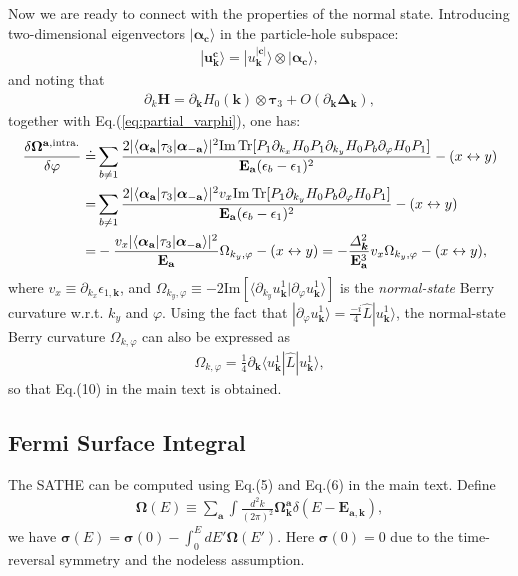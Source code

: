 \begin{subappendices}
Now we are ready to connect with the properties of the normal state. Introducing two-dimensional eigenvectors $|\boldsymbol\alpha_\mathbf c\rangle$ in the particle-hole subspace:
\begin{align}
	|\mathbf u^{\mathbf c}_{\bm{k}}\rangle=|u^{|\mathbf c|}_{\bm{k}}\rangle\otimes|\boldsymbol\alpha_\mathbf c \rangle,
\end{align}
and noting that
\begin{align}
	\partial_{k}\mathbf H=\partial_{\bm{k}} H_0(\bm{k})\otimes\boldsymbol\tau_3+O(\partial_{\bm{k}}\boldsymbol\Delta_{\bm{k}}),\label{eq:partial_k}
\end{align}
together with Eq.(\ref{eq:partial_varphi}), one has:
\begin{align}
	\frac{\delta \boldsymbol \Omega ^{\mathbf a,\text{intra.}}}{\delta \varphi}\doteq &\sum_{b\neq 1}\frac{2 |\langle \boldsymbol\alpha_\mathbf a|\tau_3| \boldsymbol\alpha_{-\mathbf a}\rangle|^2 \mbox{Im\,Tr}[P_1 \partial_{k_x}H_0 P_1 \partial_{k_y} H_0 P_b \partial_\varphi H_0 P_1]}{ \mathbf E_{\mathbf a} (\epsilon_{b}-\epsilon_{1})^2}-(x\leftrightarrow y)\notag\\
	=&\sum_{b\neq 1}\frac{2 |\langle \boldsymbol\alpha_\mathbf a|\tau_3| \boldsymbol\alpha_{-\mathbf a}\rangle|^2 v_x \mbox{Im\,Tr}[ P_1 \partial_{k_y} H_0 P_b \partial_\varphi H_0 P_1]}{ \mathbf E_{\mathbf a} (\epsilon_{b}-\epsilon_{1})^2}-(x\leftrightarrow y)\notag\\
	=&- \frac{v_x|\langle \boldsymbol\alpha_\mathbf a|\tau_3| \boldsymbol\alpha_{-\mathbf a}\rangle|^2     }{\mathbf E_{\mathbf a}}\Omega_{k_y,\varphi}-(x\leftrightarrow y)=- \frac{\varDelta_{\bm{k}}^2}{\mathbf E_{\mathbf a}^3}v_x  \Omega_{k_y,\varphi}-(x\leftrightarrow y),
\end{align}
where $v_x\equiv \partial_{k_x} \epsilon_{1,\bm{k}}$, and $\Omega_{k_y,\varphi}\equiv -2\mbox{Im}[\langle\partial_{k_y} u^1_{\bm{k}}|\partial_\varphi u^1_{\bm{k}}\rangle]$ is the \emph{normal-state} Berry curvature w.r.t. $k_y$ and $\varphi$. Using the fact that $|\partial_\varphi u^1_{\bm{k}}\rangle=\frac{-i}{4}\hat L |u^1_{\bm{k}}\rangle$, the normal-state Berry curvature $\Omega_{k,\varphi}$ can also be expressed as
\begin{align}
	\Omega_{k,\varphi}=\frac{1}{4}\partial_{\bm{k}}\langle u^1_{\bm{k}}|\hat L|u^1_{\bm{k}}\rangle,
\end{align}
so that Eq.(10) in the main text is obtained.


\subsection{Fermi Surface Integral}
The SATHE can be computed using Eq.(5) and Eq.(6) in the main text. Define
\begin{align}
	\boldsymbol\Omega(E)\equiv \sum_{\mathbf a}\int \frac{d^2k}{(2\pi)^2}\boldsymbol\Omega^\mathbf a_{\bm{k}}\delta(E-\mathbf E_{\mathbf a,\bm{k}}),
\end{align}
we have $\boldsymbol\sigma (E)=\boldsymbol\sigma(0)-\int_0^E dE'\boldsymbol\Omega(E')$. Here $\boldsymbol\sigma(0)=0$ due to the time-reversal symmetry and the nodeless assumption.


\end{subappendices}
